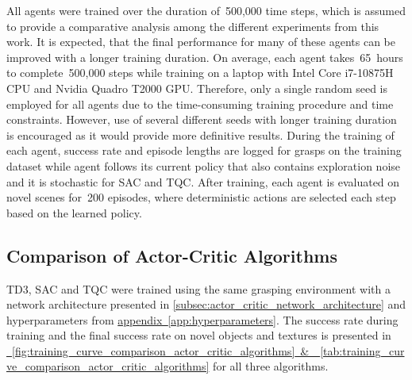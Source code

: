 All agents were trained over the duration of~500,000 time steps, which is assumed to provide a comparative analysis among the different experiments from this work. It is expected, that the final performance for many of these agents can be improved with a longer training duration. On average, each agent takes~65~hours to complete~500,000 steps while training on a laptop with Intel Core i7-10875H CPU and Nvidia Quadro T2000 GPU. Therefore, only a single random seed is employed for all agents due to the time-consuming training procedure and time constraints. However, use of several different seeds with longer training duration is encouraged as it would provide more definitive results. During the training of each agent, success rate and episode lengths are logged for grasps on the training dataset while agent follows its current policy that also contains exploration noise and it is stochastic for SAC and TQC. After training, each agent is evaluated on novel scenes for~200 episodes, where deterministic actions are selected each step based on the learned policy.

\subsection{Comparison of Actor-Critic Algorithms}

TD3, SAC and TQC were trained using the same grasping environment with a network architecture presented in \autoref{subsec:actor_critic_network_architecture} and hyperparameters from \hyperref[app:hyperparameters]{appendix~\ref*{app:hyperparameters}}. The success rate during training and the final success rate on novel objects and textures is presented in \hyperref[fig:training_curve_comparison_actor_critic_algorithms]{\figurename~\ref*{fig:training_curve_comparison_actor_critic_algorithms}~\&~\tablename~\ref*{tab:training_curve_comparison_actor_critic_algorithms}} for all three algorithms.

